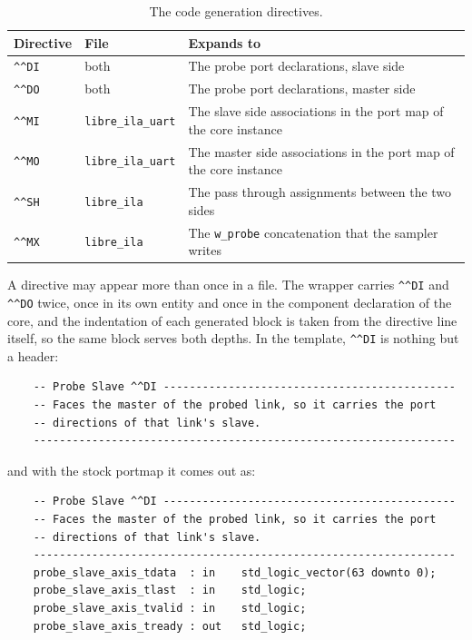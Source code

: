 \documentclass[../manual.tex]{subfiles}
\begin{document}
\begin{table}[H]
    \centering
    \begin{tabularx}{\textwidth}{|l|l|X|}
        \hline
        \rowcolor{gray!40} \textbf{Directive} & \textbf{File} & \textbf{Expands to} \\
        \hline
        \texttt{\^{}\^{}DI} & both & The probe port declarations, slave side \\
        \hline
        \texttt{\^{}\^{}DO} & both & The probe port declarations, master side \\
        \hline
        \texttt{\^{}\^{}MI} & \texttt{libre\_ila\_uart} & The slave side associations in the port map of the core instance \\
        \hline
        \texttt{\^{}\^{}MO} & \texttt{libre\_ila\_uart} & The master side associations in the port map of the core instance \\
        \hline
        \texttt{\^{}\^{}SH} & \texttt{libre\_ila} & The pass through assignments between the two sides \\
        \hline
        \texttt{\^{}\^{}MX} & \texttt{libre\_ila} & The \texttt{w\_probe} concatenation that the sampler writes \\
        \hline
    \end{tabularx}
    \caption{The code generation directives.}
    \label{tab:codegen_directives}
\end{table}

A directive may appear more than once in a file. The wrapper carries \texttt{\^{}\^{}DI} and \texttt{\^{}\^{}DO} twice, once in its own entity and once in the component declaration of the core, and the indentation of each generated block is taken from the directive line itself, so the same block serves both depths. In the template, \texttt{\^{}\^{}DI} is nothing but a header:

\begin{lstlisting}
    -- Probe Slave ^^DI ---------------------------------------------
    -- Faces the master of the probed link, so it carries the port
    -- directions of that link's slave.
    -----------------------------------------------------------------
\end{lstlisting}

and with the stock portmap it comes out as:

\begin{lstlisting}
    -- Probe Slave ^^DI ---------------------------------------------
    -- Faces the master of the probed link, so it carries the port
    -- directions of that link's slave.
    -----------------------------------------------------------------
    probe_slave_axis_tdata  : in    std_logic_vector(63 downto 0);
    probe_slave_axis_tlast  : in    std_logic;
    probe_slave_axis_tvalid : in    std_logic;
    probe_slave_axis_tready : out   std_logic;
\end{lstlisting}
\end{document}
